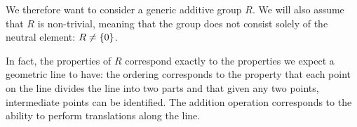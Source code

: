 We therefore want to consider a generic additive group $R$. We will also assume
that $R$ is non-trivial, meaning that the group does not consist solely of the
neutral element: $R\neq {\left\{ 0 \right\}}$.

In fact, the properties of $R$ correspond exactly to the properties we expect a
geometric line to have: the ordering corresponds to the property that each point
on the line divides the line into two parts and that given any two points,
intermediate points can be identified. The addition operation corresponds to the
ability to perform translations along the line.


